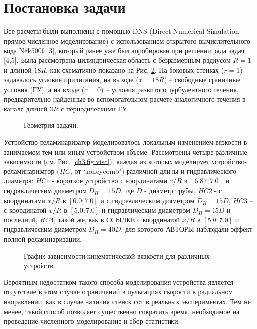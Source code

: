 \section{Постановка задачи}\label{ch3:problem}
%
Все расчеты были выполнены с помощью DNS (Direct Numerical Simulation – прямое численное моделирование) с использованием открытого вычислительного кода Nek5000 [3], 
который ранее уже был апробирован при решении ряда задач [4,5]. 
%
Была рассмотрена цилиндрическая область с безразмерным радиусом $R = 1$ и длиной $18R$, как схематично показано на Рис. \ref{ch3:fig:geom}. 
%
На боковых стенках ($r = 1$) задавалось условие прилипания, на выходе ($x = 18R$) -- свободные граничные условия (ГУ), а на входе ($x = 0$) -- условия развитого турбулентного течения, 
предварительно найденные во вспомогательном расчете аналогичного течения в канале длиной $3R$ с периодическими ГУ. 
%
\begin{figure}[ht]
    \caption{Геометрия задачи.}\label{ch3:fig:geom}
\end{figure}
%
Устройство-реламинаризатор моделировалось локальным изменением вязкости в занимаемом тем или иным устройством объеме. 
%
Рассмотрены четыре различные зависимости (см. Рис. \ref{ch3:fig:visc}), каждая из которых моделирует устройство-реламинаризатор ($HC$, от `honeycomb") различной длины и гидравлического диаметра: 
$HC1$ - короткое устройство с координатами $x/R$ в $[6.87;7.0]$ и гидравлическим диаметром $D_H = 15D$, где $D$ - диаметр трубы, 
$HC2$ - с координатами $x/R$ в $[6.0;7.0]$ и с гидравлическим диаметром $D_H = 15D$, $HC3$ -- с координатой $x/R$ в $[5.0;7.0]$ и гидравлическим диаметром $D_H = 15D$ и последний, 
$HC4$, такой же, как в ССЫЛКЕ с координатой $x/R$ в $[5.0;7.0]$ и гидравлическим диаметром $D_H = 40D$, для которого АВТОРЫ наблюдали эффект полной реламинаризации.
%
\begin{figure}[ht]
    \caption{График зависимости кинематической вязкости для различных устройств.}\label{ch3:fig:geom}
\end{figure}
%


%
Вероятным недостатком такого способа моделирования устройства является отсутствие в этом случае ограничений в пульсациях скорости в радиальном направлении, 
как в случае наличия стенок сот в реальных экспериментах. 
%
Тем не менее, такой способ позволяет существенно сократить время, необходимое на проведение численного моделирование и сбор статистики.
%

